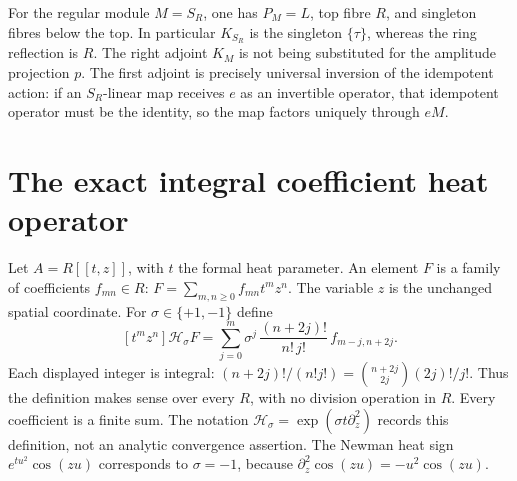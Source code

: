\documentclass[11pt,a4paper]{article}
\theoremstyle{definition}\newtheorem{definition}[theorem]{Definition}
\providecommand{\Ht}{\mathcal H}
\begin{document}
For the regular module $M=S_R$, one has $P_M=L$, top fibre $R$,
and singleton fibres below the top. In particular $K_{S_R}$
is the singleton $\{\tau\}$, whereas the ring reflection is $R$.
The right adjoint $K_M$ is not being substituted for the amplitude
projection $p$. The first adjoint is precisely universal inversion
of the idempotent action: if an $S_R$-linear map receives $e$ as
an invertible operator, that idempotent operator must be the
identity, so the map factors uniquely through $eM$.

\section{The exact integral coefficient heat operator}

Let $A=R[[t,z]]$, with $t$ the formal heat parameter. An element
$F$ is a family of coefficients $f_{mn}\in R$:
$F=\sum_{m,n\ge0}f_{mn}t^mz^n$. The variable $z$ is the
unchanged spatial coordinate. For $\sigma\in\{+1,-1\}$ define
\begin{equation}\tag{SH15}\label{sh:heat}
 [t^mz^n]\Ht_\sigma F
 =\sum_{j=0}^m
       \sigma^j\,\frac{(n+2j)!}{n!\,j!}\,f_{m-j,n+2j}.
\end{equation}
Each displayed integer is integral:
$(n+2j)!/(n!j!)=\binom{n+2j}{2j}(2j)!/j!$.
Thus the definition makes sense over every $R$, with no division
operation in $R$. Every coefficient is a finite sum. The notation
$\Ht_\sigma=\exp(\sigma t\partial_z^2)$ records this definition,
not an analytic convergence assertion. The Newman heat sign
$e^{tu^2}\cos(zu)$ corresponds to $\sigma=-1$, because
$\partial_z^2\cos(zu)=-u^2\cos(zu)$.
\end{document}
